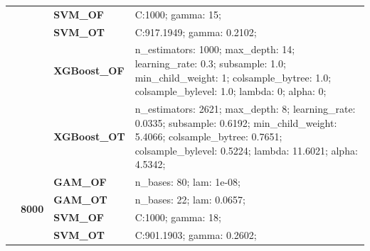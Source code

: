 \documentclass[runningheads]{llncs}
\begin{document}
\begin{table}
\begin{tabularx}{\textwidth}{>{\RaggedRight\arraybackslash}m{1.6cm}p{1.225cm}p{2.05cm}>{\RaggedRight\arraybackslash}X}
        \textbf{}                               & \textbf{}                         & \textbf{SVM\_OF}     & C:\@1000; gamma: 15;                                                                                                                                                                               \\
        \textbf{}                               & \textbf{}                         & \textbf{SVM\_OT}     & C:\@917.1949; gamma: 0.2102;                                                                                                                                                                       \\
        \textbf{}                               & \textbf{}                         & \textbf{XGBoost\_OF} & n\_estimators: 1000; max\_depth: 14; learning\_rate: 0.3; subsample: 1.0; min\_child\_weight: 1; colsample\_bytree: 1.0; colsample\_bylevel: 1.0; lambda: 0; alpha: 0;                            \\
        \textbf{}                               & \textbf{}                         & \textbf{XGBoost\_OT} & n\_estimators: 2621; max\_depth: 8; learning\_rate: 0.0335; subsample: 0.6192; min\_child\_weight: 5.4066; colsample\_bytree: 0.7651; colsample\_bylevel: 0.5224; lambda: 11.6021; alpha: 4.5342; \\
        \cline{2-4}
        \textbf{}                               & \multirow[t]{7}{*}{\textbf{8000}} & \textbf{GAM\_OF}     & n\_bases: 80; lam: 1e-08;                                                                                                                                                                         \\
        \textbf{}                               & \textbf{}                         & \textbf{GAM\_OT}     & n\_bases: 22; lam: 0.0657;                                                                                                                                                                        \\
        \textbf{}                               & \textbf{}                         & \textbf{SVM\_OF}     & C:\@1000; gamma: 18;                                                                                                                                                                               \\
        \textbf{}                               & \textbf{}                         & \textbf{SVM\_OT}     & C:\@901.1903; gamma: 0.2602;                                                                                                                                                                       \\

\end{tabularx}
\end{table}
\end{document}

